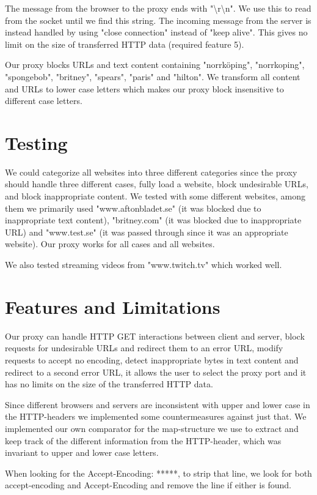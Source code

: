 \documentclass[10pt]{article}
\begin{document}
The message from the browser to the proxy ends with
"\textbackslash r\textbackslash n". We use this to read from the socket until
we find this string. The incoming message from the server is instead handled by
using "close connection" instead of "keep alive". This gives no limit on the
size of transferred HTTP data (required feature 5).

Our proxy blocks URLs and text content containing "norrk\"oping", "norrkoping",
"spongebob", "britney", "spears", "paris" and "hilton". We transform all content and
URLs to lower case letters which makes our proxy block insensitive to different
case letters.

\section{Testing}
We could categorize all websites into three different categories since the
proxy should handle three different cases, fully load a website,
block undesirable URLs, and block inappropriate content. We tested with some
different websites, among them we primarily used "www.aftonbladet.se"
(it was blocked due to inappropriate text content),
"britney.com" (it was blocked due to inappropriate URL) and "www.test.se" (it was passed through since
it was an appropriate website). Our proxy works for all cases and all websites.

We also tested streaming videos from "www.twitch.tv" which worked well.

\section{Features and Limitations}
Our proxy can handle HTTP GET interactions between client and server,
block requests for undesirable URLs and redirect them to an error URL,
modify requests to accept no encoding, detect inappropriate bytes in text
content and redirect to a second error URL, it allows the user to select the
proxy port and it has no limits on the size of the transferred HTTP data.

Since different browsers and servers are inconsistent with upper and lower case 
in the HTTP-headers we implemented some countermeasures against just that. 
We implemented our own comparator for the map-structure we use to extract and
 keep track of the different information from the HTTP-header, which was invariant 
 to upper and lower case letters. 
 
When looking for the Accept-Encoding: *****, to strip that line, we look for both  
accept-encoding and Accept-Encoding and remove the line if either is found.
\end{document}
